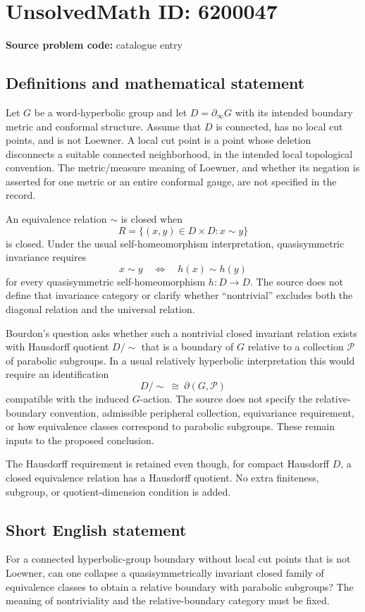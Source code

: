 \documentclass[11pt]{article}
\begin{document}
\section*{UnsolvedMath ID: 6200047}
\textbf{Source problem code:} catalogue entry
\subsection{Definitions and mathematical statement}
Let $G$ be a word-hyperbolic group and let $D=\partial_\infty G$ with its intended boundary metric and conformal structure. Assume that $D$ is connected, has no local cut points, and is not Loewner. A local cut point is a point whose deletion disconnects a suitable connected neighborhood, in the intended local topological convention. The metric/measure meaning of Loewner, and whether its negation is asserted for one metric or an entire conformal gauge, are not specified in the record.

An equivalence relation $\sim$ is closed when
\[
 R=\{(x,y)\in D\times D:x\sim y\}
\]
is closed. Under the usual self-homeomorphism interpretation, quasisymmetric invariance requires
\[
 x\sim y\quad\Longleftrightarrow\quad h(x)\sim h(y)
\]
for every quasisymmetric self-homeomorphism $h:D\to D$. The source does not define that invariance category or clarify whether ``nontrivial'' excludes both the diagonal relation and the universal relation.

Bourdon's question asks whether such a nontrivial closed invariant relation exists with Hausdorff quotient $D/\!\sim$ that is a boundary of $G$ relative to a collection $\mathcal P$ of parabolic subgroups. In a usual relatively hyperbolic interpretation this would require an identification
\[
 D/\!\sim\ \cong\ \partial(G,\mathcal P)
\]
compatible with the induced $G$-action. The source does not specify the relative-boundary convention, admissible peripheral collection, equivariance requirement, or how equivalence classes correspond to parabolic subgroups. These remain inputs to the proposed conclusion.

The Hausdorff requirement is retained even though, for compact Hausdorff $D$, a closed equivalence relation has a Hausdorff quotient. No extra finiteness, subgroup, or quotient-dimension condition is added.
\subsection{Short English statement}
For a connected hyperbolic-group boundary without local cut points that is not Loewner, can one collapse a quasisymmetrically invariant closed family of equivalence classes to obtain a relative boundary with parabolic subgroups? The meaning of nontriviality and the relative-boundary category must be fixed.
\end{document}
